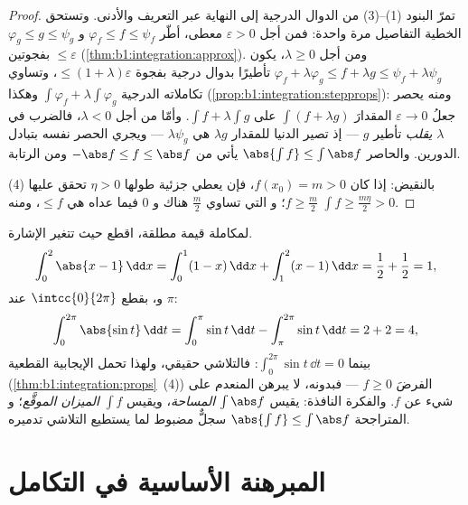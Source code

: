 \begin{proof}
تمرّ البنود (1)--(3) من الدوال الدرجية إلى النهاية عبر
التعريف  والأدنى. وتستحق الخطية التفاصيل مرة واحدة: فمن أجل
$\varepsilon > 0$ معطى، أطّر $\varphi_f \leq f \leq \psi_f$ و
$\varphi_g \leq g \leq \psi_g$ بفجوتين $\leq \varepsilon$
(\cref{thm:b1:integration:approx}). ومن أجل $\lambda \geq 0$، يكون
$\varphi_f + \lambda\varphi_g \leq f + \lambda g \leq \psi_f +
\lambda\psi_g$ تأطيرًا بدوال درجية بفجوة $\leq
(1 + \lambda)\varepsilon$، وتساوي تكاملاته الدرجية $\int
\varphi_f + \lambda\int\varphi_g$ وهكذا
(\cref{prop:b1:integration:stepprops}): ومنه يحصر جعلُ $\varepsilon \to
0$ المقدارَ $\int(f + \lambda g)$ على $\int f + \lambda\int g$.
وأمّا من أجل $\lambda < 0$، فالضرب في $\lambda$ \emph{يقلب}
تأطير $g$ --- إذ تصير  الدنيا للمقدار $\lambda g$ هي
$\lambda \psi_g$ --- ويجري الحصر نفسه بتبادل
الدورين. والحاصر $\abs{\int f} \leq \int \abs f$ يأتي من
$-\abs f \leq f \leq \abs f$ ومن الرتابة.

(4) بالنقيض: إذا كان $f(x_0) = m > 0$، فإن  يعطي
 جزئية طولها $\eta > 0$ تحقق عليها $f \geq \frac m2$؛ و
 التي تساوي $\frac m2$ هناك و $0$ فيما عداه هي $\leq f$،
ومنه $\int f \geq \frac{m\eta}{2} > 0$.
\end{proof}

\begin{example}\label{ex:b1:integration:chasleswork}
لمكاملة قيمة مطلقة، اقطع حيث تتغير الإشارة.
\[
\int_0^2 \abs{x - 1}\,\dd x
= \int_0^1 (1 - x)\,\dd x + \int_1^2 (x - 1)\,\dd x
= \frac12 + \frac12 = 1 ,
\]
و، بقطع $\intcc{0}{2\pi}$ عند $\pi$:
\[
\int_0^{2\pi} \abs{\sin t}\,\dd t
= \int_0^{\pi} \sin t\,\dd t - \int_{\pi}^{2\pi} \sin t\,\dd t
= 2 + 2 = 4 ,
\]
بينما $\int_0^{2\pi} \sin t\,\dd t = 0$: فالتلاشي حقيقي،
ولهذا تحمل  الإيجابية القطعية
(\cref{thm:b1:integration:props}~(4)) الفرضَ $f
\geq 0$ --- فبدونه، لا يبرهن  المنعدم على شيء
عن $f$. والفكرة النافذة: يقيس $\int \abs f$
\emph{المساحة}، ويقيس $\int f$ \emph{الميزان الموقَّع}؛ و
المتراجحة $\abs{\int f} \leq \int\abs f$ سجلٌّ مضبوط
لما يستطيع التلاشي تدميره.
\end{example}

\section{المبرهنة الأساسية في التكامل}

